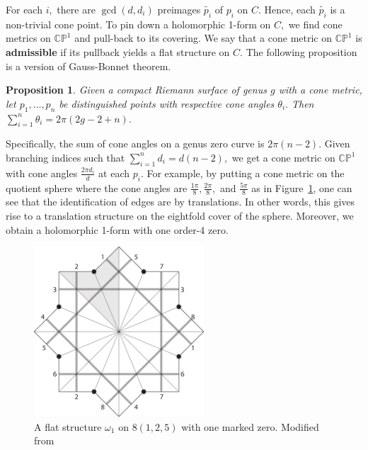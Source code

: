 \documentclass[12pt,reqno]{amsart}
\newtheorem*{proposition}{Proposition}
\theoremstyle{definition}
\theoremstyle{remark}
\begin{document}

For each $i,$ there are $\gcd(d, d_i)$ preimages $\widetilde{p_i}$ of $p_i$ on $C.$ Hence, each $\widetilde{p_i}$ is a non-trivial cone point. To pin down a holomorphic 1-form on $C,$ we find cone metrics on $\mathbb{C}\mathbb{P}^1$ and pull-back to its covering. We say that a cone metric on $\mathbb{C}\mathbb{P}^1$ is \textbf{admissible} if its pullback yields a flat structure on $C.$ The following proposition is a version of Gauss-Bonnet theorem.

\begin{proposition} Given a compact Riemann surface of genus $g$ with a cone metric, let $p_1, \ldots, p_n$ be distinguished points with respective cone angles $\theta_i.$ Then $\sum\limits_{i=1}^n \theta_i = 2 \pi (2 g - 2 + n).$
\end{proposition}

Specifically, the sum of cone angles on a genus zero curve is $2 \pi (n - 2).$ Given branching indices such that $\sum\limits_{i=1}^n d_i = d (n - 2),$ we get a cone metric on $\mathbb{C}\mathbb{P}^1$ with cone angles $\frac{2 \pi d_i}{d}$ at each $p_i.$ For example, by putting a cone metric on the quotient sphere where the cone angles are $\frac{1 \pi}{8}, \frac{2 \pi}{8},$ and $\frac{5 \pi}{8}$ as in Figure~\ref{fig:125_flat}, one can see that the identification of edges are by translations. In other words, this gives rise to a translation structure on the eightfold cover of the sphere. Moreover, we obtain a holomorphic 1-form with one order-4 zero.

\begin{figure}[htbp]
   \centering
   \includegraphics[width=2.5in]{figures/125_flat.pdf} 
  \caption{A flat structure $\omega_1$ on $8(1, 2, 5)$ with one marked zero. Modified from \cite{dami}}
  \label{fig:125_flat}
\end{figure}
\end{document}
